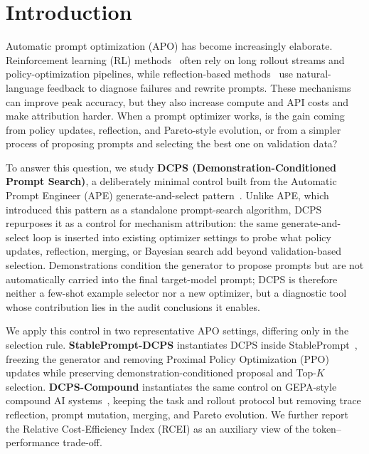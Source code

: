 \documentclass[runningheads]{llncs}
\begin{document}
\section{Introduction}

Automatic prompt optimization (APO) has become increasingly elaborate. Reinforcement learning (RL) methods~\cite{deng2022rlprompt,kwon2024stableprompt} often rely on long rollout streams and policy-optimization pipelines, while reflection-based methods~\cite{gepa} use natural-language feedback to diagnose failures and rewrite prompts. These mechanisms can improve peak accuracy, but they also increase compute and API costs and make attribution harder. When a prompt optimizer works, is the gain coming from policy updates, reflection, and Pareto-style evolution, or from a simpler process of proposing prompts and selecting the best one on validation data?

To answer this question, we study \textbf{DCPS (Demonstration-Conditioned Prompt Search)}, a deliberately minimal control built from the Automatic Prompt Engineer (APE) generate-and-select pattern~\cite{zhou2023ape}. Unlike APE, which introduced this pattern as a standalone prompt-search algorithm, DCPS repurposes it as a control for mechanism attribution: the same generate-and-select loop is inserted into existing optimizer settings to probe what policy updates, reflection, merging, or Bayesian search add beyond validation-based selection. Demonstrations condition the generator to propose prompts but are not automatically carried into the final target-model prompt; DCPS is therefore neither a few-shot example selector nor a new optimizer, but a diagnostic tool whose contribution lies in the audit conclusions it enables.

We apply this control in two representative APO settings, differing only in the selection rule. \textbf{StablePrompt-DCPS} instantiates DCPS inside StablePrompt~\cite{kwon2024stableprompt}, freezing the generator and removing Proximal Policy Optimization (PPO) updates while preserving demonstration-conditioned proposal and Top-$K$ selection. \textbf{DCPS-Compound} instantiates the same control on GEPA-style compound AI systems~\cite{gepa}, keeping the task and rollout protocol but removing trace reflection, prompt mutation, merging, and Pareto evolution. We further report the Relative Cost-Efficiency Index (RCEI) as an auxiliary view of the token--performance trade-off.
\end{document}

